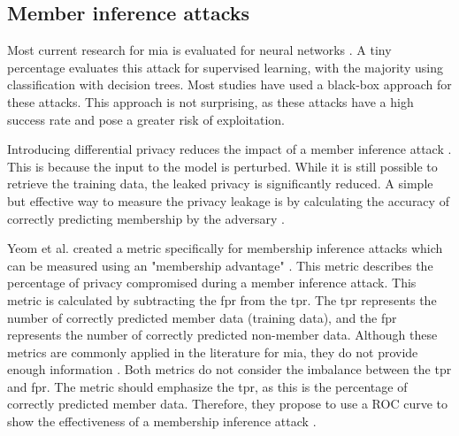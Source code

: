 \subsection{Member inference attacks}
Most current research for \gls{mia} is evaluated for neural networks \citep{rigaki_survey_2021}.
A tiny percentage evaluates this attack for supervised learning, with the majority using classification with decision trees.
Most studies have used a black-box approach \citep{rigaki_survey_2021} for these attacks.
This approach is not surprising, as these attacks have a high success rate and pose a greater risk of exploitation.

Introducing differential privacy reduces the impact of a member inference attack \citep{rigaki_survey_2021,hu_membership_2022}.
This is because the input to the model is perturbed.
While it is still possible to retrieve the training data, the leaked privacy is significantly reduced.
A simple but effective way to measure the privacy leakage is by calculating the accuracy of correctly predicting membership by the adversary \citep{choquette-choo_label-only_2021}.

Yeom et al. created a metric specifically for membership inference attacks which can be measured using an "membership advantage" \citep{yeom_privacy_2018}.
This metric describes the percentage of privacy compromised during a member inference attack.
This metric is calculated by subtracting the \gls{fpr} from the \gls{tpr}.
The \gls{tpr} represents the number of correctly predicted member data (training data), and the \gls{fpr} represents the number of correctly predicted non-member data.
Although these metrics are commonly applied in the literature for \gls{mia}, they do not provide enough information \citep{carlini_membership_2022}.
Both metrics do not consider the imbalance between the \gls{tpr} and \gls{fpr}.
The metric should emphasize the \gls{tpr}, as this is the percentage of correctly predicted member data.
Therefore, they propose to use a ROC curve to show the effectiveness of a membership inference attack \citep{carlini_membership_2022}. \newline

